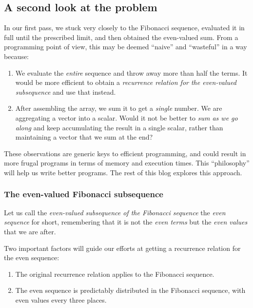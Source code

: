 \documentclass[
  a4paper,
]{article}
\begin{document}
\hypertarget{a-second-look-at-the-problem}{%
\subsection{A second look at the
problem}\label{a-second-look-at-the-problem}}

In our first pass, we stuck very closely to the Fibonacci sequence,
evaluated it in full until the prescribed limit, and then obtained the
even-valued sum. From a programming point of view, this may be deemed
``naive'' and ``wasteful'' in a way because:

\begin{enumerate}
\item
  We evaluate the \emph{entire} sequence and throw away more than half
  the terms. It would be more efficient to obtain a \emph{recurrence
  relation for the even-valued subsequence} and use that instead.
\item
  After assembling the array, we sum it to get a \emph{single} number.
  We are aggregating a vector into a scalar. Would it not be better to
  \emph{sum as we go along} and keep accumulating the result in a single
  scalar, rather than maintaining a vector that we sum at the end?
\end{enumerate}

These observations are generic keys to efficient programming, and could
result in more frugal programs in terms of memory and execution times.
This ``philosophy'' will help us write better programs. The rest of this
blog explores this approach.

\hypertarget{the-even-valued-fibonacci-subsequence-1}{%
\subsubsection{The even-valued Fibonacci
subsequence}\label{the-even-valued-fibonacci-subsequence-1}}

Let us call the \emph{even-valued subsequence of the Fibonacci sequence}
the \emph{even sequence} for short, remembering that it is not the
\emph{even terms} but the \emph{even values} that we are after.

Two important factors will guide our efforts at getting a recurrence
relation for the even sequence:

\begin{enumerate}
\item
  The original recurrence relation applies to the Fibonacci sequence.
\item
  The even sequence is predictably distributed in the Fibonacci
  sequence, with even values every three places.
\end{enumerate}
\end{document}
